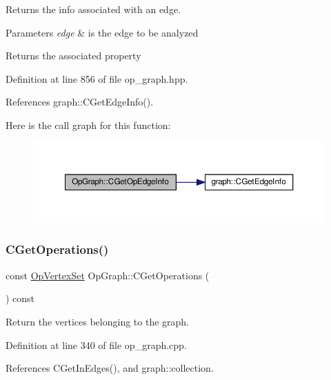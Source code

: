 Returns the info associated with an edge. 


\begin{DoxyParams}{Parameters}
{\em edge} & is the edge to be analyzed \\
\hline
\end{DoxyParams}
\begin{DoxyReturn}{Returns}
the associated property 
\end{DoxyReturn}


Definition at line 856 of file op\+\_\+graph.\+hpp.



References graph\+::\+C\+Get\+Edge\+Info().

Here is the call graph for this function\+:
\nopagebreak
\begin{figure}[H]
\begin{center}
\leavevmode
\includegraphics[width=350pt]{d6/d79/structOpGraph_ad029d85b1174dc53da7add156c68c30a_cgraph}
\end{center}
\end{figure}
\mbox{\label{structOpGraph_a6a68fec329f88429b5b455dbcd2f2427}} 
\subsubsection{\texorpdfstring{C\+Get\+Operations()}{CGetOperations()}}
{\footnotesize\ttfamily const \hyperlink{classOpVertexSet}{Op\+Vertex\+Set} Op\+Graph\+::\+C\+Get\+Operations (\begin{DoxyParamCaption}{ }\end{DoxyParamCaption}) const}



Return the vertices belonging to the graph. 



Definition at line 340 of file op\+\_\+graph.\+cpp.



References C\+Get\+In\+Edges(), and graph\+::collection.



